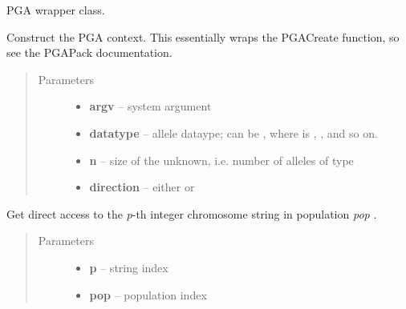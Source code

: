 \documentclass[letterpaper,11pt,english]{sphinxmanual}
\begin{document}
\begin{fulllineitems}
\label{api_reference:PGA}
PGA wrapper class.

\begin{fulllineitems}
\label{api_reference:PGA.__init__}
Construct the PGA context.  This essentially wraps the PGACreate
function, so see the PGAPack documentation.
\begin{quote}\begin{description}
\item[{Parameters}] \leavevmode\begin{itemize}
\item {} 
\textbf{argv} -- system argument

\item {} 
\textbf{datatype} -- allele dataype; can be ,
where  is , , and so on.

\item {} 
\textbf{n} -- size of the unknown, i.e. number of alleles of type

\item {} 
\textbf{direction} -- either  or 

\end{itemize}

\end{description}\end{quote}

\end{fulllineitems}


\begin{fulllineitems}
\label{api_reference:PGA.GetIntegerChromosome}
Get direct access to the \emph{p}-th integer chromosome string in
population \emph{pop} .
\begin{quote}\begin{description}
\item[{Parameters}] \leavevmode\begin{itemize}
\item {} 
\textbf{p} -- string index

\item {} 
\textbf{pop} -- population index


\end{itemize}
\end{description}
\end{quote}
\end{fulllineitems}
\end{fulllineitems}
\end{document}
